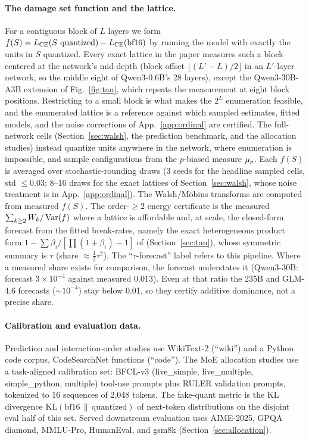 \paragraph{The damage set function and the lattice.} For a contiguous block of $L$ layers we form
$f(S)=L_{\mathrm{CE}}(S\ \text{quantized}) - L_{\mathrm{CE}}(\text{bf16})$ by running the model with exactly the units in $S$
quantized. Every exact lattice in the paper measures such a block centered at the network's mid-depth (block
offset $\lfloor(L'-L)/2\rfloor$ in an $L'$-layer network, so the middle eight of Qwen3-0.6B's 28
layers), except the Qwen3-30B-A3B extension of Fig.~\ref{fig:tau}, which repeats the measurement at
eight block positions. Restricting to a small block is what makes the $2^L$ enumeration feasible, and
the enumerated lattice is a reference against which sampled estimates, fitted models, and the
noise corrections of App.~\ref{app:ordinal} are certified. The full-network cells
(Section~\ref{sec:walsh}, the prediction benchmark, and the allocation studies) instead quantize units
anywhere in the network, where enumeration is impossible, and sample configurations from the $p$-biased
measure $\mu_p$. Each $f(S)$ is
averaged over stochastic-rounding draws (3 seeds for the headline sampled cells, std $\le 0.03$; 8--16
draws for the exact lattices of Section~\ref{sec:walsh}, whose noise treatment is in App.~\ref{app:ordinal}).
The
Walsh/M\"obius transforms are computed from measured $f(S)$. The order-$\ge 2$
energy certificate is the measured $\sum_{k\ge 2}W_k/\operatorname{Var}(f)$ where a lattice is affordable and, at scale,
the closed-form forecast from the fitted break-rates, namely the exact heterogeneous product form
$1 - \sum\beta_i/[\prod(1+\beta_i)-1]$ of \propfive{} (Section~\ref{sec:tau}), whose symmetric summary is $\tau$
(share $\approx\tfrac12\tau^2$). The ``$\tau$-forecast'' label refers to this pipeline. Where
a measured share exists for comparison, the forecast understates it (Qwen3-30B: forecast
$3{\times}10^{-4}$ against measured 0.013). Even at that ratio the 235B and GLM-4.6 forecasts
(${\sim}10^{-4}$) stay below 0.01, so they certify additive dominance, not a precise share.

\paragraph{Calibration and evaluation data.} Prediction and interaction-order studies use WikiText-2
(``wiki'') and a Python code corpus, CodeSearchNet functions (``code''). 
The MoE allocation studies use a task-aligned calibration set: BFCL-v3
(live\_simple, live\_multiple, simple\_python, multiple) tool-use prompts plus RULER validation prompts,
tokenized to 16 sequences of 2{,}048 tokens. The fake-quant metric is the KL divergence
$\mathrm{KL}(\text{bf16} \,\|\, \text{quantized})$ of next-token distributions on the disjoint eval half
of this set. Served downstream evaluation uses AIME-2025, GPQA
diamond, MMLU-Pro, HumanEval, and gsm8k (Section~\ref{sec:allocation}).

